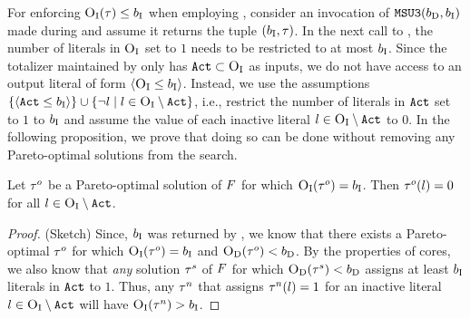 For enforcing $\textsc{O}_{\text{I}}(\tau)\le b_{\text{I}}$ when employing \msu{}, consider an invocation of $\texttt{MSU3}(b_{\text{D}}, b_{\text{I}})$ made during \algname{} and assume it returns the tuple $(b_{\text{I}}, \tau)$. 
In the next call to \Simpr{}, the number of literals in $\textsc{O}_{\text{I}}$ set to $1$ needs to be restricted to at most $b_{\text{I}}$. 
Since the totalizer maintained by \msu{} only has $\texttt{Act} \subset \textsc{O}_{\text{I}}$ as inputs, we do not have access to an output literal of form  $\langle \textsc{O}_{\text{I}} \leq b_{\text{I}} \rangle$.
Instead, we use  the assumptions $\{ \langle \texttt{Act} \leq b_{\text{I}} \rangle\} \cup \{ \lnot l \mid l \in \textsc{O}_{\text{I}} \setminus \texttt{Act} \}$, i.e., restrict the number of literals in $\texttt{Act}$ set to $1$ to $b_{\text{I}}$ and assume the value of each inactive literal $l \in \textsc{O}_{\text{I}} \setminus \texttt{Act}$ to $0$. 
In the following proposition, we prove that doing so can be done without removing any Pareto-optimal solutions from the search. 
\begin{proposition}\label{prop:sound}
  Let $\tau^o$ be a Pareto-optimal solution of $F$ for which $\textsc{O}_{\text{I}}(\tau^o) = b_{\text{I}}$.
  Then $\tau^o(l) = 0$ for all $l \in \textsc{O}_{\text{I}} \setminus \texttt{Act}$. 

  \begin{proof}(Sketch)
    Since, $b_{\text{I}}$ was returned by \msu{}, we know that there exists a Pareto-optimal $\tau^o$ for which $\textsc{O}_{\text{I}}(\tau^o) = b_{\text{I}}$ and $\textsc{O}_{\text{D}}(\tau^o) < b_{\text{D}}$.
    By the properties of cores, we also know that \emph{any} solution $\tau^s$ of $F$ for which $\textsc{O}_{\text{D}}(\tau^s) < b_{\text{D}}$ assigns at least $b_{\text{I}}$ literals in $\texttt{Act}$ to $1$.
    Thus, any $\tau^n$ that assigns $\tau^n(l) = 1$ for an inactive literal $l \in \textsc{O}_{\text{I}} \setminus \texttt{Act}$ will have $\textsc{O}_{\text{I}}(\tau^n) > b_{\text{I}}$.
  \end{proof}
\end{proposition}

